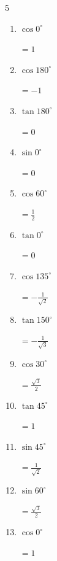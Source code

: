 \begin{multicols}{5}
\begin{enumerate}
  \item $\displaystyle \cos{0^\circ}$

        $\displaystyle =1$

  \item $\displaystyle \cos{180^\circ}$

        $\displaystyle =-1$

  \item $\displaystyle \tan{180^\circ}$

        $\displaystyle =0$

\columnbreak %

  \item $\displaystyle \sin{0^\circ}$

        $\displaystyle =0$

  \item $\displaystyle \cos{60^\circ}$

        $\displaystyle =\frac{1}{2}$

  \item $\displaystyle \tan{0^\circ}$

        $\displaystyle =0$

  \item $\displaystyle \cos{135^\circ}$

        $\displaystyle =-\frac{1}{\sqrt{2}}$

  \item $\displaystyle \tan{150^\circ}$

        $\displaystyle =-\frac{1}{\sqrt{3}}$

  \item $\displaystyle \cos{30^\circ}$

        $\displaystyle =\frac{\sqrt{3}}{2}$

  \item $\displaystyle \tan{45^\circ}$

        $\displaystyle =1$

  \item $\displaystyle \sin{45^\circ}$

        $\displaystyle =\frac{1}{\sqrt{2}}$

  \item $\displaystyle \sin{60^\circ}$

        $\displaystyle =\frac{\sqrt{3}}{2}$

  \item $\displaystyle \cos{0^\circ}$

        $\displaystyle =1$


\end{enumerate}
\end{multicols}
